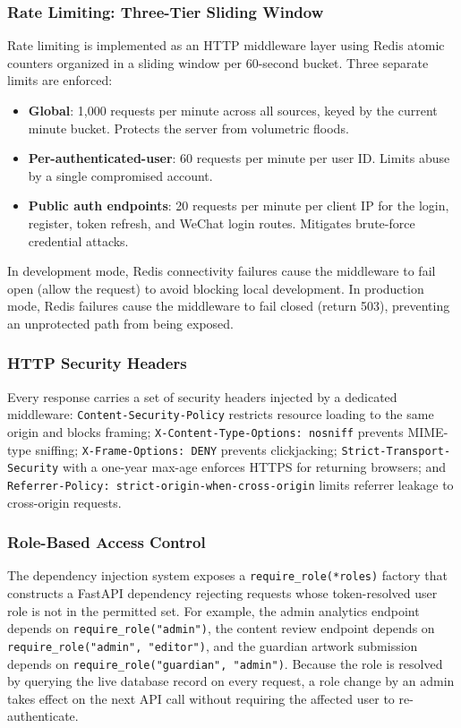 \documentclass[11pt]{article}
\begin{document}
\subsubsection{Rate Limiting: Three-Tier Sliding Window}
Rate limiting is implemented as an HTTP middleware layer using Redis atomic counters organized in a sliding window per 60-second bucket. Three separate limits are enforced:
\begin{itemize}[leftmargin=2.2em]
    \item \textbf{Global}: 1,000 requests per minute across all sources, keyed by the current minute bucket. Protects the server from volumetric floods.
    \item \textbf{Per-authenticated-user}: 60 requests per minute per user ID. Limits abuse by a single compromised account.
    \item \textbf{Public auth endpoints}: 20 requests per minute per client IP for the login, register, token refresh, and WeChat login routes. Mitigates brute-force credential attacks.
\end{itemize}
In development mode, Redis connectivity failures cause the middleware to fail open (allow the request) to avoid blocking local development. In production mode, Redis failures cause the middleware to fail closed (return 503), preventing an unprotected path from being exposed.

\subsubsection{HTTP Security Headers}
Every response carries a set of security headers injected by a dedicated middleware: \texttt{Content-Security-Policy} restricts resource loading to the same origin and blocks framing; \texttt{X-Content-Type-Options: nosniff} prevents MIME-type sniffing; \texttt{X-Frame-Options: DENY} prevents clickjacking; \texttt{Strict-Transport-Security} with a one-year max-age enforces HTTPS for returning browsers; and \texttt{Referrer-Policy: strict-origin-when-cross-origin} limits referrer leakage to cross-origin requests.

\subsubsection{Role-Based Access Control}
The dependency injection system exposes a \texttt{require\_role(*roles)} factory that constructs a FastAPI dependency rejecting requests whose token-resolved user role is not in the permitted set. For example, the admin analytics endpoint depends on \texttt{require\_role("admin")}, the content review endpoint depends on \texttt{require\_role("admin", "editor")}, and the guardian artwork submission depends on \texttt{require\_role("guardian", "admin")}. Because the role is resolved by querying the live database record on every request, a role change by an admin takes effect on the next API call without requiring the affected user to re-authenticate.
\end{document}
